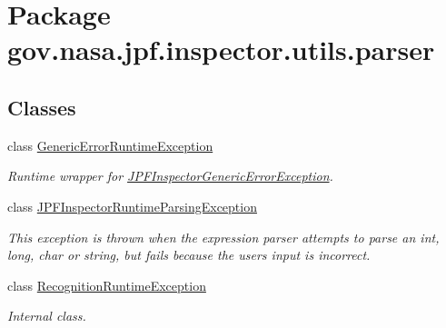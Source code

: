 \hypertarget{namespacegov_1_1nasa_1_1jpf_1_1inspector_1_1utils_1_1parser}{}\section{Package gov.\+nasa.\+jpf.\+inspector.\+utils.\+parser}
\label{namespacegov_1_1nasa_1_1jpf_1_1inspector_1_1utils_1_1parser}
\subsection*{Classes}
\begin{DoxyCompactItemize}
\item 
class \hyperlink{classgov_1_1nasa_1_1jpf_1_1inspector_1_1utils_1_1parser_1_1_generic_error_runtime_exception}{Generic\+Error\+Runtime\+Exception}
\begin{DoxyCompactList}\small\item\em Runtime wrapper for \hyperlink{}{J\+P\+F\+Inspector\+Generic\+Error\+Exception}. \end{DoxyCompactList}\item 
class \hyperlink{classgov_1_1nasa_1_1jpf_1_1inspector_1_1utils_1_1parser_1_1_j_p_f_inspector_runtime_parsing_exception}{J\+P\+F\+Inspector\+Runtime\+Parsing\+Exception}
\begin{DoxyCompactList}\small\item\em This exception is thrown when the expression parser attempts to parse an int, long, char or string, but fails because the user\textquotesingle{}s input is incorrect. \end{DoxyCompactList}\item 
class \hyperlink{classgov_1_1nasa_1_1jpf_1_1inspector_1_1utils_1_1parser_1_1_recognition_runtime_exception}{Recognition\+Runtime\+Exception}
\begin{DoxyCompactList}\small\item\em Internal class. \end{DoxyCompactList}\end{DoxyCompactItemize}
